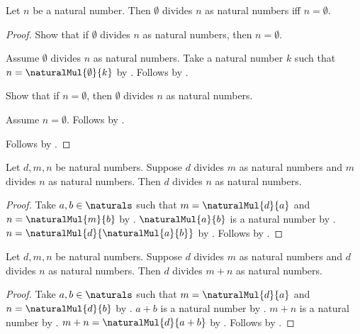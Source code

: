 \begin{proposition}\label{zero_divides_natural_iff_zero}
    Let $n$ be a natural number.
    Then $\emptyset$ divides $n$ as natural numbers iff
        $n=\emptyset$.
\end{proposition}
\begin{proof}
    Show that if $\emptyset$ divides $n$ as natural numbers, then
        $n=\emptyset$.
    \begin{subproof}
        Assume $\emptyset$ divides $n$ as natural numbers.
        Take a natural number $k$ such that
            $n=\naturalMul{\emptyset}{k}$
            by .
        Follows by .
    \end{subproof}
    Show that if $n=\emptyset$, then
        $\emptyset$ divides $n$ as natural numbers.
    \begin{subproof}
        Assume $n=\emptyset$.
        Follows by .
    \end{subproof}
    Follows by \auto.
\end{proof}

\begin{proposition}\label{natural_divisibility_transitive}
    Let $d,m,n$ be natural numbers.
    Suppose $d$ divides $m$ as natural numbers and
        $m$ divides $n$ as natural numbers.
    Then $d$ divides $n$ as natural numbers.
\end{proposition}
\begin{proof}
    Take $a,b\in\naturals$ such that
        $m=\naturalMul{d}{a}$ and $n=\naturalMul{m}{b}$
        by .
    $\naturalMul{a}{b}$ is a natural number
        by .
    $n=\naturalMul{d}{\naturalMul{a}{b}}$
        by .
    Follows by .
\end{proof}

\begin{proposition}\label{common_divisor_divides_sum}
    Let $d,m,n$ be natural numbers.
    Suppose $d$ divides $m$ as natural numbers and
        $d$ divides $n$ as natural numbers.
    Then $d$ divides $m+n$ as natural numbers.
\end{proposition}
\begin{proof}
    Take $a,b\in\naturals$ such that
        $m=\naturalMul{d}{a}$ and $n=\naturalMul{d}{b}$
        by .
    $a+b$ is a natural number by .
    $m+n$ is a natural number by .
    $m+n=\naturalMul{d}{a+b}$
        by .
    Follows by .
\end{proof}


